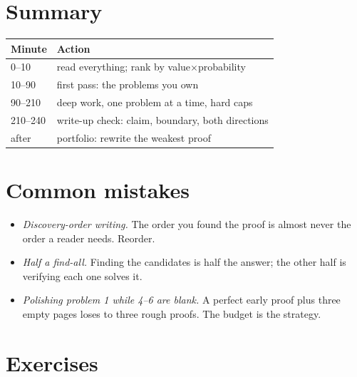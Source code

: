 \section{Summary}
\begin{center}\small
\begin{tabular}{@{}ll@{}}
\toprule
\textbf{Minute} & \textbf{Action} \\
\midrule
0--10 & read everything; rank by value$\times$probability \\
10--90 & first pass: the problems you own \\
90--210 & deep work, one problem at a time, hard caps \\
210--240 & write-up check: claim, boundary, both directions \\
after & portfolio: rewrite the weakest proof \\
\bottomrule
\end{tabular}
\end{center}

\section{Common mistakes}
\begin{itemize}
\item \emph{Discovery-order writing.} The order you found the proof is
almost never the order a reader needs. Reorder.
\item \emph{Half a find-all.} Finding the candidates is half the
answer; the other half is verifying each one solves it.
\item \emph{Polishing problem 1 while 4--6 are blank.} A perfect early
proof plus three empty pages loses to three rough proofs. The budget
is the strategy.
\end{itemize}

\section*{Exercises}
